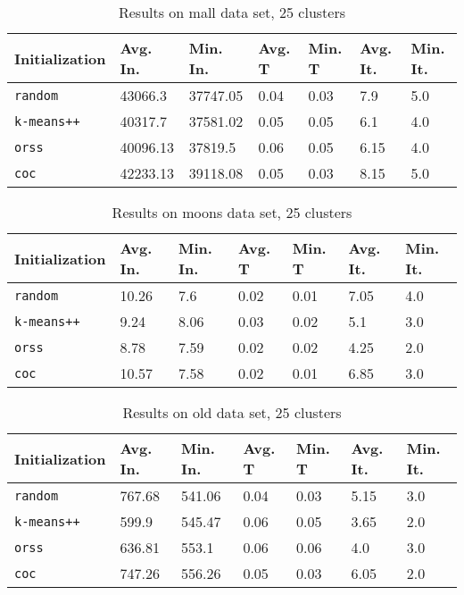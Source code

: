 \begin{table}[p]
	\begin{center}
		\begin{tabular}{|l|l|l|l|l|l|l|}
			\hline
			Initialization & Avg. In. & Min. In. & Avg. T & Min. T & Avg. It. & Min. It.\\\hline
			\texttt{random} & 43066.3 & 37747.05 & 0.04 & 0.03 & 7.9 & 5.0\\\hline
			\texttt{k-means++} & 40317.7 & 37581.02 & 0.05 & 0.05 & 6.1 & 4.0\\\hline
			\texttt{orss} & 40096.13 & 37819.5 & 0.06 & 0.05 & 6.15 & 4.0\\\hline
			\texttt{coc} & 42233.13 & 39118.08 & 0.05 & 0.03 & 8.15 & 5.0\\\hline
		\end{tabular}
		\caption{Results on mall data set, 25 clusters}
		\label{tbl:mall25}
	\end{center}
\end{table}

\begin{table}[p]
	\begin{center}
		\begin{tabular}{|l|l|l|l|l|l|l|}
			\hline
			Initialization & Avg. In. & Min. In. & Avg. T & Min. T & Avg. It. & Min. It.\\\hline
			\texttt{random} & 10.26 & 7.6 & 0.02 & 0.01 & 7.05 & 4.0\\\hline
			\texttt{k-means++} & 9.24 & 8.06 & 0.03 & 0.02 & 5.1 & 3.0\\\hline
			\texttt{orss} & 8.78 & 7.59 & 0.02 & 0.02 & 4.25 & 2.0\\\hline
			\texttt{coc} & 10.57 & 7.58 & 0.02 & 0.01 & 6.85 & 3.0\\\hline
		\end{tabular}
		\caption{Results on moons data set, 25 clusters}
		\label{tbl:moons25}
	\end{center}
\end{table}

\begin{table}[p]
	\begin{center}
		\begin{tabular}{|l|l|l|l|l|l|l|}
			\hline
			Initialization & Avg. In. & Min. In. & Avg. T & Min. T & Avg. It. & Min. It.\\\hline
			\texttt{random} & 767.68 & 541.06 & 0.04 & 0.03 & 5.15 & 3.0\\\hline
			\texttt{k-means++} & 599.9 & 545.47 & 0.06 & 0.05 & 3.65 & 2.0\\\hline
			\texttt{orss} & 636.81 & 553.1 & 0.06 & 0.06 & 4.0 & 3.0\\\hline
			\texttt{coc} & 747.26 & 556.26 & 0.05 & 0.03 & 6.05 & 2.0\\\hline
		\end{tabular}
		\caption{Results on old data set, 25 clusters}
		\label{tbl:old25}
	\end{center}
\end{table}

